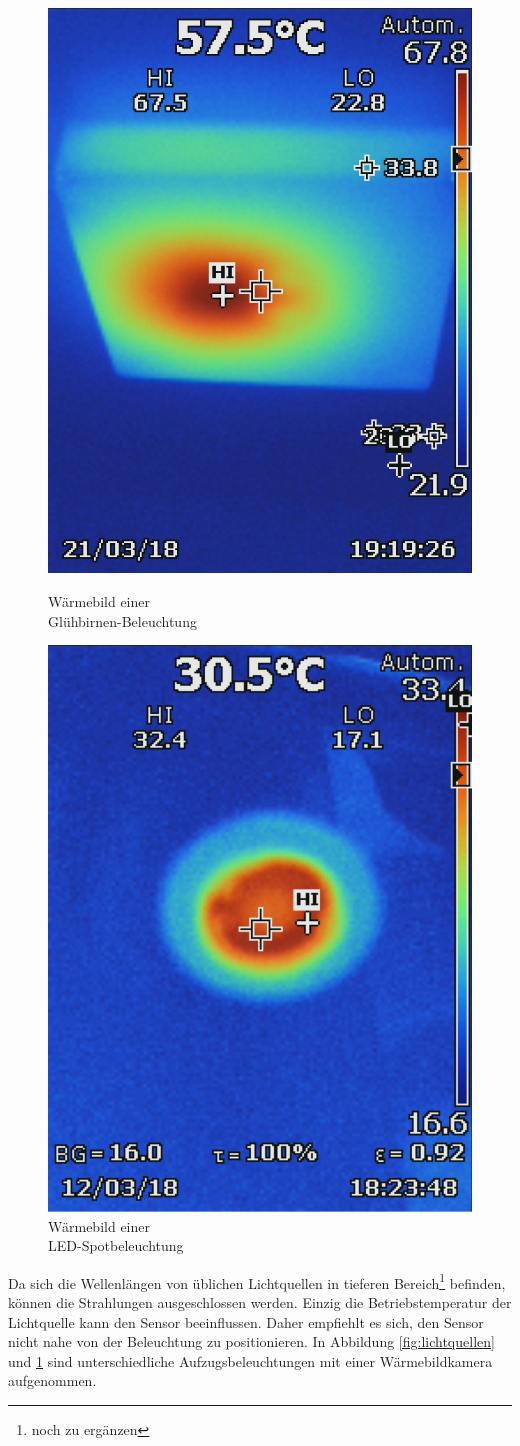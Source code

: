 \begin{figure}[!ht]
	\centering
	\begin{minipage}[b]{0.49\linewidth}
	\centering
	\includegraphics[width=0.5\linewidth]{fig/Lichtquellen.jpg}
	\caption{Wärmebild einer\\ Glühbirnen-Beleuchtung}
	\label{fig:lichtquellen}
	\end{minipage}
	\hfill
	\begin{minipage}[b]{0.49\linewidth}
	\centering
	\includegraphics[width=0.5\linewidth]{fig/Lichtquelle.png}
	\caption{Wärmebild einer\\ LED-Spotbeleuchtung}
	\label{fig:m2lichtquelle}
	\end{minipage}
\end{figure}

Da sich die Wellenlängen von üblichen Lichtquellen in tieferen Bereich\footnote[11]{noch zu ergänzen} befinden, können die Strahlungen ausgeschlossen werden. Einzig die Betriebstemperatur der Lichtquelle kann den Sensor beeinflussen. Daher empfiehlt es sich, den Sensor nicht nahe von der Beleuchtung zu positionieren. In Abbildung \ref{fig:lichtquellen}  und \ref{fig:m2lichtquelle} sind unterschiedliche Aufzugsbeleuchtungen mit einer Wärmebildkamera aufgenommen.



